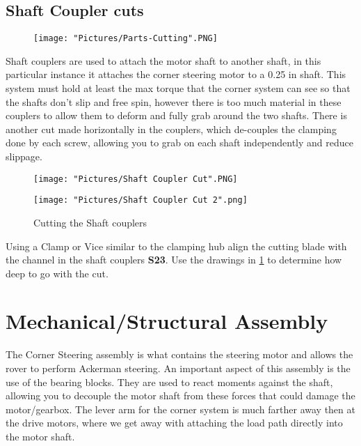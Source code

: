 \documentclass[12pt]{article}
\begin{document}
\subsection{Shaft Coupler cuts}

\begin{figure}[H]
	\centering
	\texttt{[image: "Pictures/Parts-Cutting".PNG]}
\end{figure}

Shaft couplers are used to attach the motor shaft to another shaft, in this particular instance it attaches the corner steering motor to a 0.25 in shaft. This system must hold at least the max torque that the corner system can see so that the shafts don't slip and free spin, however there is too much material in these couplers to allow them to deform and fully grab around the two shafts. There is another cut made horizontally in the couplers, which de-couples the clamping done by each screw, allowing you to grab on each shaft independently and reduce slippage. 


\begin{figure}[H]
  	\centering
  	\begin{minipage}[b]{0.35\textwidth}
   		 \texttt{[image: "Pictures/Shaft Coupler Cut".PNG]}		
	\end{minipage}
 	 \hfill
 	 \begin{minipage}[b]{0.55\textwidth}
  		  \texttt{[image: "Pictures/Shaft Coupler Cut 2".png]}
  	\end{minipage}
 	 \caption{Cutting the Shaft couplers}
	\label{Shaft coupler cut}
\end{figure}

Using a Clamp or Vice similar to the clamping hub align the cutting blade with the channel in the shaft couplers \textbf{S23}. Use the drawings in \ref{Shaft coupler cut} to determine how deep to go with the cut.


\section{Mechanical/Structural Assembly} 
The Corner Steering assembly is what contains the steering motor and allows the rover to perform Ackerman steering. An important aspect of this assembly is the use of the bearing blocks. They are used to react moments against the shaft, allowing you to decouple the motor shaft from these forces that could damage the motor/gearbox. The lever arm for the corner system is much farther away then at the drive motors, where we get away with attaching the load path directly into the motor shaft.
\end{document}
